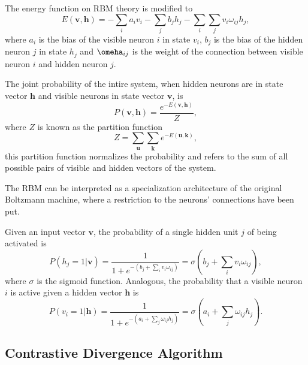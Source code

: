 The energy function on RBM theory is modified to
\begin{equation}
    \label{eq:rubik-state-energy-rbm}
    E(\mathbf{v}, \mathbf{h}) = - \sum_{i} a_{i} v_{i} - \sum_{j} b_{j} h_{j} - \sum_{i} \sum_{j} v_{i} \omega_{ij} h_{j},
\end{equation}
where $a_{i}$ is the bias of the visible neuron $i$ in state $v_{i}$, $b_{j}$ is the bias of the hidden neuron $j$ in state $h_{j}$ and $\omeha_{ij}$ is the weight of the connection between visible neuron $i$ and hidden neuron $j$.

The joint probability of the intire system, when hidden neurons are in state vector $\mathbf{h}$ and visible neurons in state vector $\mathbf{v}$, is
\begin{equation}
    \label{eq:rubik-prob-rbm}
    P(\mathbf{v}, \mathbf{h}) = \frac{e^{-E(\mathbf{v}, \mathbf{h})}}{Z},
\end{equation}
where $Z$ is known as the partition function
\begin{equation}
    \label{eq:rubik-partition-func-rbm}
    Z = \sum_{\mathbf{u}} \sum_{\mathbf{k}} e^{-E(\mathbf{u}, \mathbf{k})},
\end{equation}
this partition function normalizes the probability and refers to the sum of all possible pairs of visible and hidden vectors of the system.

The RBM can be interpreted as a specialization architecture of the original Boltzmann machine, where a restriction to the neurons' connections have been put.

Given an input vector $\mathbf{v}$, the probability of a single hidden unit $j$ of being activated is 
\begin{equation}
    \label{eq:rubik-prob-hidden-active}
    P(h_{j} = 1 | \mathbf{v}) = \frac{1}{1 + e^{- \left( b_{j} + \sum_{i} v_{i} \omega_{ij} \right)}} = \sigma \left( b_{j} + \sum_{i} v_{i} \omega_{ij} \right),
\end{equation}
where $\sigma$ is the sigmoid function.
Analogous, the probability that a visible neuron $i$ is active given a hidden vector $\mathbf{h}$ is
\begin{equation}
    \label{eq:rubik-prob-visible-active}
    P(v_{i} = 1 | \mathbf{h}) = \frac{1}{1 + e^{- \left( a_{i} + \sum_{j} \omega_{ij} h_{j} \right)}} = \sigma \left( a_{i} + \sum_{j} \omega_{ij} h_{j} \right).
\end{equation}



\subsection{Contrastive Divergence Algorithm}

